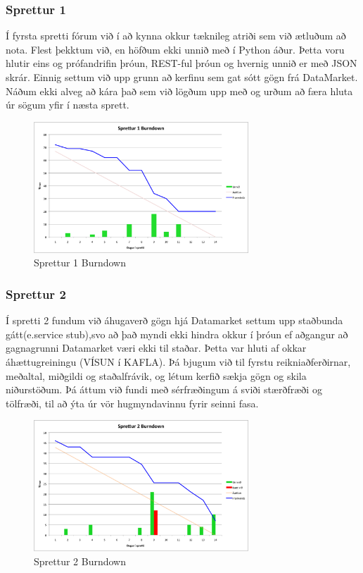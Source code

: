 \documentclass{article}
\begin{document}
\subsubsection{Sprettur 1}
Í fyrsta spretti fórum við í að kynna okkur tæknileg atriði sem við ætluðum að
nota.
Flest þekktum við, en höfðum ekki unnið með í Python áður. Þetta voru hlutir
eins og prófandrifin þróun, REST-ful þróun og hvernig 
unnið er með JSON skrár. Einnig settum við upp grunn að kerfinu sem gat sótt
gögn frá DataMarket. Náðum ekki alveg að kára það sem við lögðum 
upp með og urðum að færa hluta úr sögum yfir í næsta sprett.
\begin{figure}[H]
  \centering
  \includegraphics[width=0.72\textwidth]{Sprettur1_Burndown.png}
  \caption{Sprettur 1 Burndown}
\end{figure}

\subsubsection{Sprettur 2}
Í spretti 2 fundum við áhugaverð gögn hjá Datamarket settum upp staðbunda
gátt(e.service stub),svo að það myndi ekki hindra okkur í þróun ef 
aðgangur að gagnagrunni Datamarket væri ekki til staðar. Þetta var hluti af
okkar áhættugreiningu (VÍSUN í KAFLA). 
Þá bjugum við til fyrstu reikniaðferðirnar, meðaltal, miðgildi og staðalfrávik,
og létum kerfið sækja gögn og skila niðurstöðum.
Þá áttum við fundi með sérfræðingum á sviði stærðfræði og tölfræði, til að ýta
úr vör hugmyndavinnu fyrir seinni fasa.
\begin{figure}[H]
 \centering
 \includegraphics[width=0.72\textwidth]{Sprettur2_Burndown.png}
 \caption{Sprettur 2 Burndown}
\end{figure}
\end{document}
